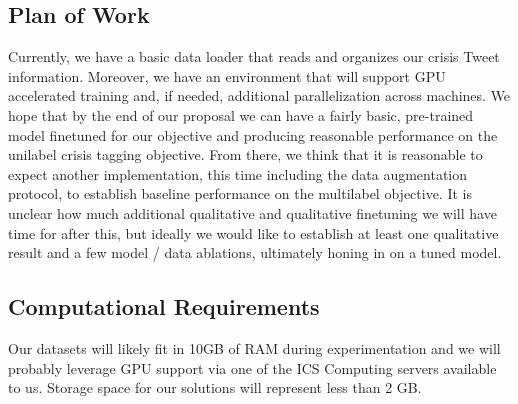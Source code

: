 \documentclass[11pt,a4paper]{article}
\begin{document}
\subsection{Plan of Work}%
\label{sub:plan_of_work}

Currently, we have a basic data loader that reads and organizes our crisis Tweet information. Moreover, we have an environment that will support GPU accelerated training and, if needed, additional parallelization across machines. We hope that by the end of our proposal we can have a fairly basic, pre-trained model finetuned for our objective and producing reasonable performance on the unilabel crisis tagging objective. From there, we think that it is reasonable to expect another implementation, this time including the data augmentation protocol, to establish baseline performance on the multilabel objective. It is unclear how much additional qualitative and qualitative finetuning we will have time for after this, but ideally we would like to establish at least one qualitative result and a few model / data ablations, ultimately honing in on a tuned model.

\subsection{Computational Requirements}
Our datasets will likely fit in 10GB of RAM during experimentation and we will probably leverage GPU support via one of the ICS Computing servers available to us. Storage space for our solutions will represent less than 2 GB.






\appendix
\end{document}
